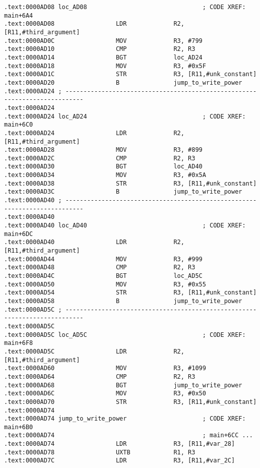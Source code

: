 \begin{lstlisting}
.text:0000AD08 loc_AD08                                ; CODE XREF: main+6A4
.text:0000AD08                 LDR             R2, [R11,#third_argument]
.text:0000AD0C                 MOV             R3, #799
.text:0000AD10                 CMP             R2, R3
.text:0000AD14                 BGT             loc_AD24
.text:0000AD18                 MOV             R3, #0x5F
.text:0000AD1C                 STR             R3, [R11,#unk_constant]
.text:0000AD20                 B               jump_to_write_power
.text:0000AD24 ; ---------------------------------------------------------------------------
.text:0000AD24
.text:0000AD24 loc_AD24                                ; CODE XREF: main+6C0
.text:0000AD24                 LDR             R2, [R11,#third_argument]
.text:0000AD28                 MOV             R3, #899
.text:0000AD2C                 CMP             R2, R3
.text:0000AD30                 BGT             loc_AD40
.text:0000AD34                 MOV             R3, #0x5A
.text:0000AD38                 STR             R3, [R11,#unk_constant]
.text:0000AD3C                 B               jump_to_write_power
.text:0000AD40 ; ---------------------------------------------------------------------------
.text:0000AD40
.text:0000AD40 loc_AD40                                ; CODE XREF: main+6DC
.text:0000AD40                 LDR             R2, [R11,#third_argument]
.text:0000AD44                 MOV             R3, #999
.text:0000AD48                 CMP             R2, R3
.text:0000AD4C                 BGT             loc_AD5C
.text:0000AD50                 MOV             R3, #0x55
.text:0000AD54                 STR             R3, [R11,#unk_constant]
.text:0000AD58                 B               jump_to_write_power
.text:0000AD5C ; ---------------------------------------------------------------------------
.text:0000AD5C
.text:0000AD5C loc_AD5C                                ; CODE XREF: main+6F8
.text:0000AD5C                 LDR             R2, [R11,#third_argument]
.text:0000AD60                 MOV             R3, #1099
.text:0000AD64                 CMP             R2, R3
.text:0000AD68                 BGT             jump_to_write_power
.text:0000AD6C                 MOV             R3, #0x50
.text:0000AD70                 STR             R3, [R11,#unk_constant]
.text:0000AD74
.text:0000AD74 jump_to_write_power                     ; CODE XREF: main+6B0
.text:0000AD74                                         ; main+6CC ...
.text:0000AD74                 LDR             R3, [R11,#var_28]
.text:0000AD78                 UXTB            R1, R3
.text:0000AD7C                 LDR             R3, [R11,#var_2C]

\end{lstlisting}
